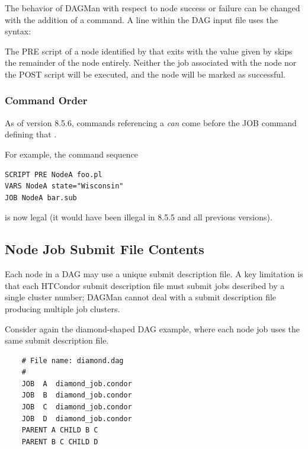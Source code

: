 The behavior of DAGMan with respect to node success or failure can
be changed with the addition of a  command. 
A  line within the DAG input file uses the syntax: 

  

The PRE script of a node identified by  that exits with the value 
given by 
skips the remainder of the node entirely.  
Neither the job associated with the node nor
the POST script will be executed,
and the node will be marked as successful.


\subsubsection{\label{sec:DAG-command_order}Command Order}
\label{dagman:command order}

As of version 8.5.6, commands referencing a  \emph{can}
come before the JOB command defining that .

For example, the command sequence
\begin{verbatim}
SCRIPT PRE NodeA foo.pl
VARS NodeA state="Wisconsin"
JOB NodeA bar.sub
\end{verbatim}
is now legal (it would have been illegal in 8.5.5 and all previous
versions).

\subsection{Node Job Submit File Contents}

Each node in a DAG may use a unique submit description file.
A key limitation is that
each HTCondor submit description file must submit jobs
described by a single cluster number;
DAGMan cannot deal with a submit description file producing
multiple job clusters.

Consider again the diamond-shaped DAG example, 
where each node job uses the same submit description file.

\begin{verbatim}
    # File name: diamond.dag
    #
    JOB  A  diamond_job.condor 
    JOB  B  diamond_job.condor 
    JOB  C  diamond_job.condor	
    JOB  D  diamond_job.condor
    PARENT A CHILD B C
    PARENT B C CHILD D
\end{verbatim}

